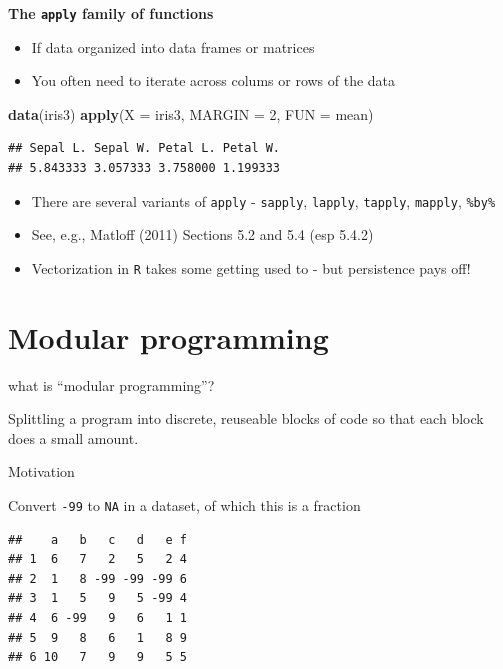\documentclass[ignorenonframetext,]{beamer}
\newenvironment{Shaded}{\begin{snugshade}}{\end{snugshade}}
\newcommand{\KeywordTok}[1]{\textcolor[rgb]{0.13,0.29,0.53}{\textbf{#1}}}
\newcommand{\DataTypeTok}[1]{\textcolor[rgb]{0.13,0.29,0.53}{#1}}
\newcommand{\DecValTok}[1]{\textcolor[rgb]{0.00,0.00,0.81}{#1}}
\newcommand{\NormalTok}[1]{#1}
\providecommand{\tightlist}{%
  \setlength{\itemsep}{0pt}\setlength{\parskip}{0pt}}
\begin{document}
\begin{frame}[fragile]

\textbf{The \texttt{apply} family of functions}

\begin{itemize}[<+->]
\tightlist
\item
  If data organized into data frames or matrices
\item
  You often need to iterate across colums or rows of the data
\end{itemize}

\begin{Shaded}
\begin{Highlighting}[]
\KeywordTok{data}\NormalTok{(iris3)}
\KeywordTok{apply}\NormalTok{(}\DataTypeTok{X =}\NormalTok{ iris3, }\DataTypeTok{MARGIN =} \DecValTok{2}\NormalTok{, }\DataTypeTok{FUN =}\NormalTok{ mean)}
\end{Highlighting}
\end{Shaded}

\begin{verbatim}
## Sepal L. Sepal W. Petal L. Petal W. 
## 5.843333 3.057333 3.758000 1.199333
\end{verbatim}

\begin{itemize}[<+->]
\tightlist
\item
  There are several variants of \texttt{apply} - \texttt{sapply},
  \texttt{lapply}, \texttt{tapply}, \texttt{mapply}, \texttt{\%by\%}
\item
  See, e.g., Matloff (2011) Sections 5.2 and 5.4 (esp 5.4.2)
\item
  Vectorization in \texttt{R} takes some getting used to - but
  persistence pays off!
\end{itemize}

\end{frame}

\section{Modular programming}\label{modular-programming}

\begin{frame}{what is ``modular programming''?}

Splittling a program into discrete, reuseable blocks of code so that
each block does a small amount.

\end{frame}

\begin{frame}[fragile]{Motivation}

Convert \texttt{-99} to \texttt{NA} in a dataset, of which this is a
fraction

\begin{verbatim}
##    a   b   c   d   e f
## 1  6   7   2   5   2 4
## 2  1   8 -99 -99 -99 6
## 3  1   5   9   5 -99 4
## 4  6 -99   9   6   1 1
## 5  9   8   6   1   8 9
## 6 10   7   9   9   5 5
\end{verbatim}

\end{frame}
\end{document}
